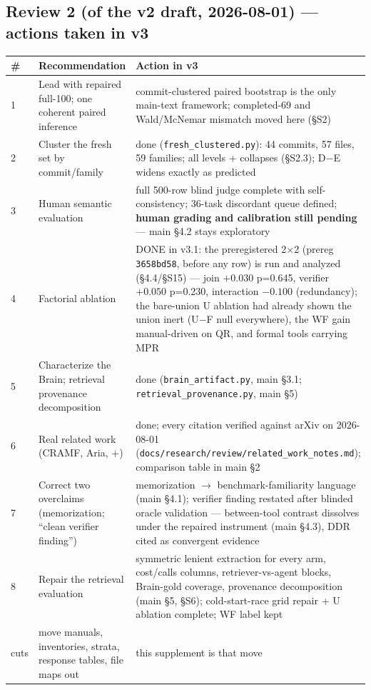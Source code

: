 \documentclass[10pt]{article}
\newcommand{\code}[1]{\texttt{#1}}
\begin{document}
\subsection{Review 2 (of the v2 draft, 2026-08-01) --- actions taken in
v3}\label{s12:r2}

\begin{center}\footnotesize
\begin{tabular}{@{}p{}p{}p{}@{}}
\toprule
\# & Recommendation & Action in v3 \\
\midrule
1 & Lead with repaired full-100; one coherent paired inference & commit-clustered paired bootstrap is the only main-text framework; completed-69 and Wald/McNemar mismatch moved here (\S S2) \\
2 & Cluster the fresh set by commit/family & done (\code{fresh\_clustered.py}): 44 commits, 57 files, 59 families; all levels + collapses (\S S2.3); D$-$E widens exactly as predicted \\
3 & Human semantic evaluation & full 500-row blind judge complete with self-consistency; 36-task discordant queue defined; \textbf{human grading and calibration still pending} --- main \S 4.2 stays exploratory \\
4 & Factorial ablation & DONE in v3.1: the preregistered 2$\times$2 (prereg \code{3658bd58}, before any row) is run and analyzed (\S 4.4/\S S15) --- join $+0.030$ p=0.645, verifier $+0.050$ p=0.230, interaction $-0.100$ (redundancy); the bare-union U ablation had already shown the union inert (U$-$F null everywhere), the WF gain manual-driven on QR, and formal tools carrying MPR \\
5 & Characterize the Brain; retrieval provenance decomposition & done (\code{brain\_artifact.py}, main \S 3.1; \code{retrieval\_provenance.py}, main \S 5) \\
6 & Real related work (CRAMF, Aria, +) & done; every citation verified against arXiv on 2026-08-01 (\code{docs/research/review/related\_work\_notes.md}); comparison table in main \S 2 \\
7 & Correct two overclaims (memorization; ``clean verifier finding'') & memorization $\to$ benchmark-familiarity language (main \S 4.1); verifier finding restated after blinded oracle validation --- between-tool contrast dissolves under the repaired instrument (main \S 4.3), DDR cited as convergent evidence \\
8 & Repair the retrieval evaluation & symmetric lenient extraction for every arm, cost/calls columns, retriever-vs-agent blocks, Brain-gold coverage, provenance decomposition (main \S 5, \S S6); cold-start-race grid repair + U ablation complete; WF label kept \\
cuts & move manuals, inventories, strata, response tables, file maps out & this supplement is that move \\
\bottomrule
\end{tabular}
\end{center}
\end{document}
